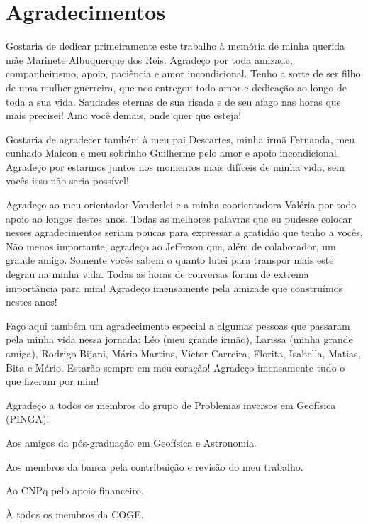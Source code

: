 \chapter*{Agradecimentos}

Gostaria de dedicar primeiramente este trabalho à memória de minha querida mãe Marinete Albuquerque dos Reis. Agradeço por toda amizade, companheirismo, apoio, paciência e amor incondicional. Tenho a sorte de ser filho de uma mulher guerreira, que nos entregou todo amor e dedicação ao longo de toda a sua vida. Saudades eternas de sua risada e de seu afago nas horas que mais precisei! Amo você demais, onde quer que esteja!

Gostaria de agradecer também à meu pai Descartes, minha irmã Fernanda, meu cunhado Maicon e meu sobrinho Guilherme pelo amor e apoio incondicional. Agradeço por estarmos juntos nos momentos mais difíceis de minha vida, sem vocês isso não seria possível!  

Agradeço ao meu orientador Vanderlei e a minha coorientadora Valéria por todo apoio ao longos destes anos. Todas as melhores palavras que eu pudesse colocar nesses agradecimentos seriam poucas para expressar a gratidão que tenho a vocês. Não menos importante, agradeço ao Jefferson que, além de colaborador, um grande amigo. Somente vocês sabem o quanto lutei para transpor mais este degrau na minha vida. Todas as horas de conversas foram de extrema importância para mim! Agradeço imensamente pela amizade que construímos nestes anos!  

Faço aqui também um agradecimento especial a algumas pessoas que passaram pela minha vida nessa jornada: Léo (meu grande irmão), Larissa (minha grande amiga), Rodrigo Bijani, Mário Martins, Victor Carreira, Florita, Isabella, Matias, Bita e Mário. Estarão sempre em meu coração! Agradeço imensamente tudo o que fizeram por mim!

Agradeço a todos os membros do grupo de Problemas inversos em Geofísica (PINGA)!

Aos amigos da pós-graduação em Geofísica e Astronomia.

Aos membros da banca pela contribuição e revisão do meu trabalho.

Ao CNPq pelo apoio financeiro.

À todos os membros da COGE.

